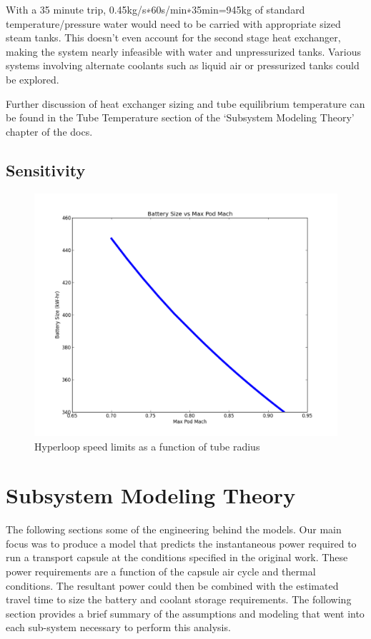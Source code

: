 \documentclass[heading.tex]{subfiles}
\begin{document}
With a 35 minute trip, 0.45kg/s∗60s/min∗35min=945kg of standard temperature/pressure water would need to be carried with appropriate sized steam tanks. This doesn't even account for the second stage heat exchanger, making the system nearly infeasible with water and unpressurized tanks. Various systems involving alternate coolants such as liquid air or pressurized tanks could be explored.

Further discussion of heat exchanger sizing and tube equilibrium temperature can be found in the Tube Temperature section of the ‘Subsystem Modeling Theory’ chapter of the docs.

\subsection{Sensitivity}
\begin{figure}[hbtp]
\centering
\includegraphics[scale=0.5]{images/mach_vs_energy.png}
\caption{Hyperloop speed limits as a function of tube radius}
\end{figure}

\section{Subsystem Modeling Theory}

The following sections some of the engineering behind the models. Our main focus was to produce a model that predicts the instantaneous power required to run a transport capsule at the conditions specified in the original work. These power requirements are a function of the capsule air cycle and thermal conditions. The resultant power could then be combined with the estimated travel time to size the battery and coolant storage requirements. The following section provides a brief summary of the assumptions and modeling that went into each sub-system necessary to perform this analysis.
\end{document}
